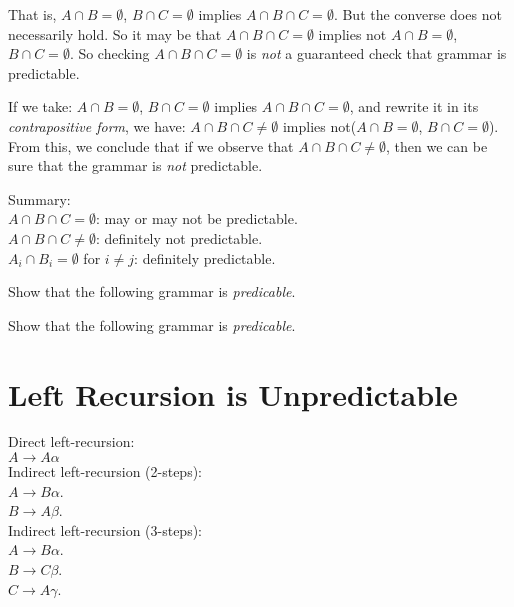 
That is, $A \cap B = \emptyset$, $B \cap C = \emptyset$ implies 
$A \cap B \cap C = \emptyset$.
But the converse does not necessarily hold. 
So it may be that $A \cap B \cap C = \emptyset$ implies not 
$A \cap B = \emptyset$, $B \cap C = \emptyset$. 
So checking  $A \cap B \cap C = \emptyset$
is \textit{not} a guaranteed check that 
grammar is predictable. 

If we take:
$A \cap B = \emptyset$, $B \cap C = \emptyset$ implies 
$A \cap B \cap C = \emptyset$, 
and rewrite it in its \textit{contrapositive form}, 
we have:
$A \cap B \cap C \neq \emptyset$ implies not($A \cap B = \emptyset$, $B \cap C = \emptyset$).
From this, we conclude that
if we observe that 
$A \cap B \cap C \neq \emptyset$, 
then we can be sure that the grammar is \textit{not} predictable. 

Summary:\\
$A \cap B \cap C = \emptyset$: may or may not be predictable. \\
$A \cap B \cap C \neq \emptyset$: definitely not predictable. \\
$A_i \cap B_i = \emptyset$ for $i \neq j$: definitely predictable.

\frmrule

\begin{example}
Show that the following grammar is \textit{predicable}. 
\end{example}

\begin{example}
Show that the following grammar is \textit{predicable}. 
\end{example}


\frmrule




\section{Left Recursion is Unpredictable}

Direct left-recursion: \\
$A \rightarrow A\alpha$\\

Indirect left-recursion (2-steps): \\
$A \rightarrow B\alpha$.\\
$B \rightarrow A\beta$.\\

Indirect left-recursion (3-steps):  \\
$A \rightarrow B\alpha$.\\
$B \rightarrow C\beta$.\\
$C \rightarrow A\gamma$.\\


